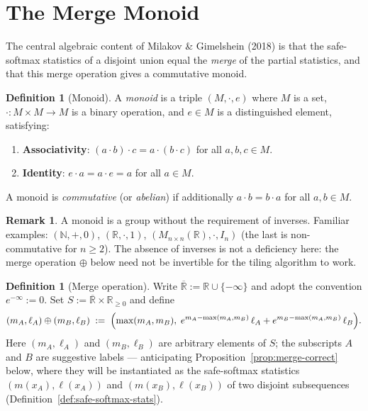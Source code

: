\documentclass[11pt]{amsart}
\theoremstyle{plain}
\theoremstyle{definition}
\newtheorem{definition}[theorem]{Definition}
\newtheorem{remark}[theorem]{Remark}
\newcommand{\R}{\mathbb{R}}
\newcommand{\N}{\mathbb{N}}
\begin{document}
\section{The Merge Monoid}
\label{sec:merge-monoid}

The central algebraic content of Milakov \& Gimelshein (2018) is that the
safe-softmax statistics of a disjoint union equal the \emph{merge} of the
partial statistics, and that this merge operation gives a commutative monoid.

\begin{definition}[Monoid]
\label{def:monoid}
A \emph{monoid} is a triple $(M, \cdot, e)$ where $M$ is a set,
$\cdot : M \times M \to M$ is a binary operation, and $e \in M$ is a
distinguished element, satisfying:
\begin{enumerate}[label=(\roman*)]
    \item \textbf{Associativity}: $(a \cdot b) \cdot c = a \cdot (b \cdot c)$
    for all $a,b,c \in M$.
    \item \textbf{Identity}: $e \cdot a = a \cdot e = a$ for all $a \in M$.
\end{enumerate}
A monoid is \emph{commutative} (or \emph{abelian}) if additionally
$a \cdot b = b \cdot a$ for all $a, b \in M$.
\end{definition}

\begin{remark}
A monoid is a group without the requirement of inverses.  Familiar examples:
$(\N, +, 0)$, $(\R, \cdot, 1)$, $(M_{n\times n}(\R), \cdot, I_n)$ (the last is
non-commutative for $n \geq 2$).  The absence of inverses is not a deficiency
here: the merge operation $\oplus$ below need not be invertible for the
tiling algorithm to work.
\end{remark}

\begin{definition}[Merge operation]
\label{def:merge}
Write $\overline{\R} := \R \cup \{-\infty\}$ and adopt the convention
$e^{-\infty} := 0$.  Set $S := \overline{\R} \times \R_{\geq 0}$ and define
\[
    (m_A, \ell_A) \oplus (m_B, \ell_B)
    \;:=\;
    \Bigl(
        \max(m_A,m_B),\;
        e^{m_A - \max(m_A,m_B)}\,\ell_A
        + e^{m_B - \max(m_A,m_B)}\,\ell_B
    \Bigr).
\]
Here $(m_A, \ell_A)$ and $(m_B, \ell_B)$ are arbitrary elements of $S$;
the subscripts $A$ and $B$ are suggestive labels --- anticipating
Proposition~\ref{prop:merge-correct} below, where they will be instantiated
as the safe-softmax statistics $(m(x_A), \ell(x_A))$ and
$(m(x_B), \ell(x_B))$ of two disjoint subsequences (Definition~\ref{def:safe-softmax-stats}).
\end{definition}
\end{document}
